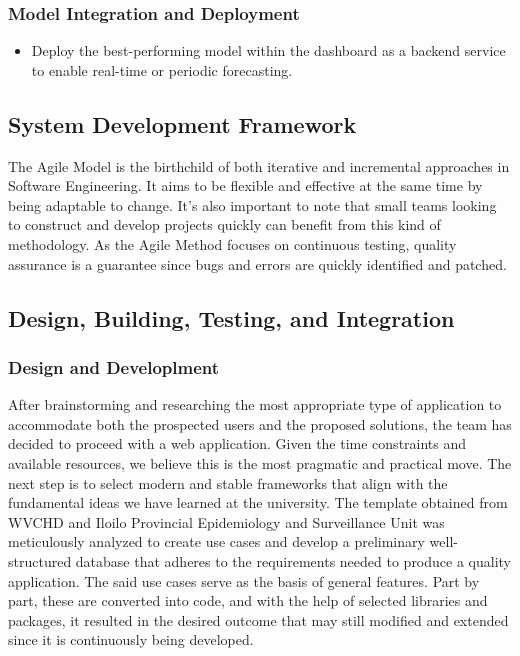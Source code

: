 \subsubsection{Model Integration and Deployment}
\begin{itemize}
	\item Deploy the best-performing model within the dashboard as a backend service to enable real-time or periodic forecasting.
\end{itemize}


\subsection{System Development Framework}
The Agile Model is the birthchild of both iterative and incremental approaches in Software Engineering. It aims to be flexible and effective at the same time by being adaptable to change. It's also important to note that small teams looking to construct and develop projects quickly can benefit from this kind of methodology. As the Agile Method focuses on continuous testing, quality assurance is a guarantee since bugs and errors are quickly identified and patched. 

\subsection{Design, Building, Testing, and Integration}
\subsubsection{Design and Developlment}
After brainstorming and researching the most appropriate type of application to accommodate both the prospected users and the proposed solutions, the team has decided to proceed with a web application. Given the time constraints and available resources, we believe this is the most pragmatic and practical move. The next step is to select modern and stable frameworks that align with the fundamental ideas we have learned at the university. The template obtained from WVCHD and Iloilo Provincial Epidemiology and Surveillance Unit was meticulously analyzed to create use cases and develop a preliminary well-structured database that adheres to the requirements needed to produce a quality application. The said use cases serve as the basis of general features. Part by part, these are converted into code, and with the help of selected libraries and packages, it resulted in the desired outcome that may still modified and extended since it is continuously being developed. 

